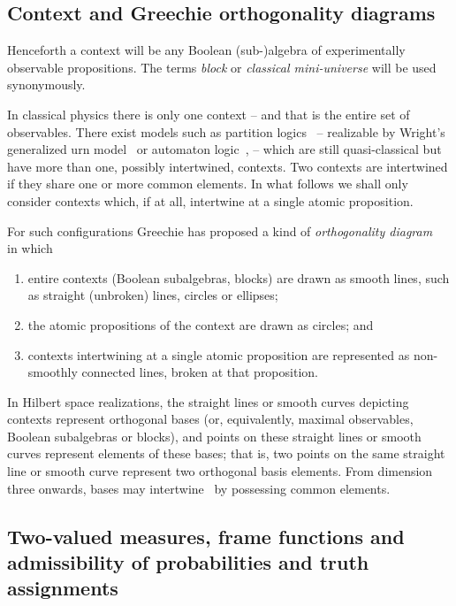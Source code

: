 \subsection{Context and Greechie orthogonality diagrams}
\label{2017-b-cagod}

Henceforth a context will be any Boolean (sub-)algebra of experimentally observable propositions.
The terms {\em block} or {\em classical mini-universe} will be used synonymously.

In classical physics there is only one context -- and that is the entire set of observables.
There exist models such as partition logics~\cite{dvur-pul-svo,svozil-2001-eua,svozil-2008-ql}
-- realizable by Wright's generalized urn model~\cite{wright} or automaton logic~\cite{schaller-92,svozil-93,schaller-95,schaller-96},
-- which are still quasi-classical but have more than one, possibly intertwined, contexts.
Two contexts are intertwined if they share one or more common elements.
In what follows we shall only consider contexts which, if at all,  intertwine at a single atomic proposition.

For such configurations Greechie has proposed a kind of {\em orthogonality diagram}~\cite{greechie:71,kalmbach-83,svozil-tkadlec}
in which
\begin{enumerate}
\item
entire contexts (Boolean subalgebras, blocks) are drawn as smooth lines,  such as straight (unbroken) lines, circles or ellipses;
\item
the atomic propositions of the context are drawn as circles; and
\item
contexts intertwining at a single atomic proposition are represented as non-smoothly connected lines, broken at that proposition.
\end{enumerate}

In Hilbert space realizations,
the straight lines or smooth curves depicting contexts represent orthogonal bases (or, equivalently, maximal observables, Boolean subalgebras or blocks),
and points on these straight lines or smooth curves represent elements of these bases;
that is, two points  on the same straight line or smooth curve represent two orthogonal basis elements.
From dimension three onwards, bases may intertwine~\cite{Gleason} by possessing common elements.

\subsection{Two-valued measures, frame functions and admissibility of probabilities and truth assignments}
\label{2017-b-admissability}

